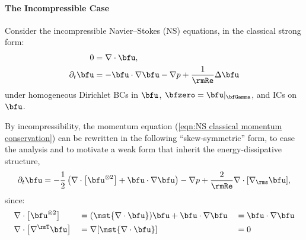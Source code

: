 \paragraph*{The Incompressible Case}
    Consider the incompressible Navier–Stokes (NS) equations, in the classical strong form:
    \begin{align}
                       0  &=  \nabla\cdot\bfu,  \label{eqn:NS mass conservation}  \\
        \partial_{t}\bfu  &=  - \bfu\cdot\nabla\bfu - \nabla p + \frac{1}{\rmRe}\Delta\bfu    \label{eqn:NS classical momentum conservation}
    \end{align}
    under homogeneous Dirichlet BCs in $\bfu$, $\bfzero  =  \bfu|_{\bfGamma}$, and ICs on $\bfu$.

    By incompressibility, the momentum equation (\ref{eqn:NS classical momentum conservation}) can be rewritten in the following ``skew-symmetric'' form, to ease the analysis and to motivate a weak form that inherit the energy-dissipative structure,
    \begin{equation}\label{eqn:NS skew-symmetric momentum conservation}
        \partial_{t}\bfu  =  - \frac{1}{2}\left(\nabla\cdot\left[\bfu^{\otimes 2}\right] + \bfu\cdot\nabla\bfu\right) - \nabla p + \frac{2}{\rmRe}\nabla\cdot[\nabla_{\rms}\bfu],
    \end{equation}
    since:
    \begin{align}
        &\nabla\cdot\left[\bfu^{\otimes 2}\right]  &&=  (\mst{\nabla\cdot\bfu})\bfu + \bfu\cdot\nabla\bfu  &&=  \bfu\cdot\nabla\bfu  \\
        &\nabla\cdot\left[\nabla^{\rmT}\bfu\right]  &&=  \nabla[\mst{\nabla\cdot\bfu}]  &&=  0
    \end{align}

    \begin{remark}
    \end{remark}
    
